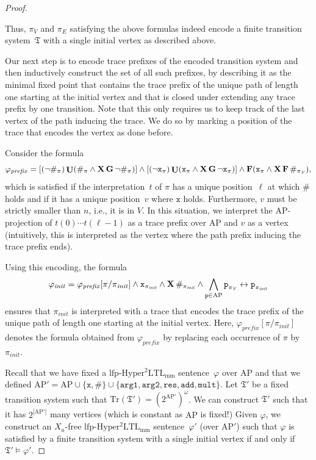 \documentclass[dvipsnames,10pt,a4paper]{amsart}
\theoremstyle{definition}
\theoremstyle{remark}
\renewcommand{\phi}{\varphi}
\newcommand{\size}[1]{|#1|}
\newcommand{\pow}[1]{2^{#1}}
\newcommand{\set}[1]{\{#1\}}
\newcommand{\F}{\mathop{\mathbf{F}\vphantom{a}}\nolimits}
\newcommand{\G}{\mathop{\mathbf{G}\vphantom{a}}\nolimits}
\DeclareMathOperator{\U}{\mathbf{U}}
\newcommand{\X}{\mathop{\mathbf{X}\vphantom{a}}\nolimits}
\newcommand{\lfpsohyltlfp}{\mathrm{lfp\text{-}{Hyper^2LTL_{\mathrm{mm}}}}\xspace}
\newcommand{\ap}[0]{\mathrm{AP}}
\newcommand{\univar}{X_a}
\newcommand{\tsys}{\mathfrak{T}}
\newcommand{\traces}{\mathrm{Tr}}
\newcommand{\inprop}{\mathtt{x}}
\newcommand{\proposition}{\texttt{p}}
\newcommand{\argone}{\texttt{arg1}}
\newcommand{\argtwo}{\texttt{arg2}}
\newcommand{\res}{\texttt{res}}
\newcommand{\add}{\texttt{add}}
\newcommand{\mult}{\texttt{mult}}
\newcommand{\vertices}{\mathit{V}}
\newcommand{\edges}{\mathit{E}}
\newcommand{\prefix}{\mathit{prefix}}
\newcommand{\init}{\mathit{init}}
\begin{document}
\begin{proof}
\begin{itemize}
\end{itemize}
Thus, $\pi_\vertices$ and $\pi_\edges$ satisfying the above formulas indeed encode a
finite transition system~$\tsys$ with a single initial vertex as described above.

Our next step is to encode trace prefixes of the encoded transition system and then inductively construct the set of all such prefixes, by describing it as the minimal fixed point that contains the trace prefix of the unique path of length one starting at the initial vertex and that is closed under extending any trace prefix by one transition. Note that this only requires us to keep track of the last vertex of the path inducing the trace. We do so by marking a position of the trace that encodes the vertex as done before.

 Consider the formula
	\[\phi_\prefix = 
    [(\neg\#_\pi) \U (\#_\pi \wedge \X\G\neg \#_\pi)] \wedge 
    [(\neg\inprop_\pi) \U (\inprop_\pi \wedge \X\G\neg \inprop_\pi)] \wedge 
    \F (\inprop_{\pi} \wedge \X\F \#_{\pi_\vertices})
	,\]
	 which is satisfied if the interpretation~$t$ of $\pi$ has a unique position~$\ell$ at which $\#$ holds and if it has a unique position~$v$ where $\inprop$ holds. Furthermore, $v$ must be strictly smaller than $n$, i.e., it is in $V$.
	In this situation, we interpret the $\ap$-projection of $t(0)\cdots t(\ell-1)$ as a trace prefix over $\ap$ and $v$ as a vertex (intuitively, this is interpreted as the vertex where the path prefix inducing the trace prefix ends).
	
    
	Using this encoding, the formula
	 \[
\phi_\init = \phi_\prefix[\pi/\pi_\init] \wedge \inprop_{\pi_\init} \wedge \X\#_{\pi_\init} \wedge \bigwedge_{\proposition \in \ap} \proposition_{\pi_\vertices} \leftrightarrow \proposition_{\pi_\init}
\]
ensures that $\pi_\init$ is interpreted with a trace that encodes the trace prefix of the unique path of length one starting at the initial vertex. Here, $\phi_\prefix[\pi/\pi_\init]$ denotes the formula obtained from $\phi_\prefix$ by replacing each occurrence of $\pi$ by $\pi_\init$.

Recall that we have fixed a $\lfpsohyltlfp$ sentence~$\phi$ over $\ap$ and that we defined $\ap' =  \ap \cup \set{\inprop,\#} \cup \set{\argone, \argtwo, \res, \add, \mult}$.
Let $\tsys'$ be a fixed transition system such that $\traces(\tsys') = (\pow{\ap'})^\omega$.
We can construct $\tsys'$ such that it has $2^{\size{\ap'}}$ many vertices (which is constant as $\ap$ is fixed!)
Given $\phi$, we construct an $\univar$-free $\lfpsohyltlfp$ sentence~$\phi'$ (over $\ap'$) such that $\phi$ is satisfied by a finite transition system with a single initial vertex if and only if $\tsys' \models\phi'$.


\end{proof}
\end{document}
